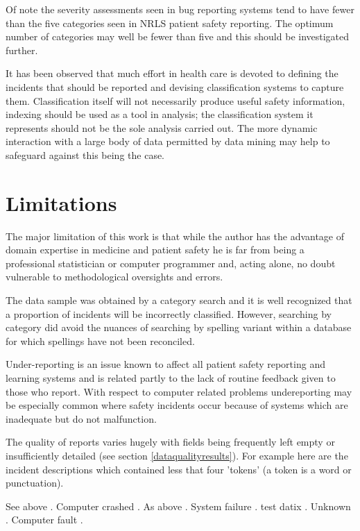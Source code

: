 Of note the severity assessments seen in bug reporting systems tend to have fewer than the five categories seen in NRLS patient safety reporting. The optimum number of categories may well be fewer than five and this should be investigated further.

It has been observed that much effort in health care is devoted to defining the incidents that should be reported and devising classification systems to capture them. Classification itself will not necessarily produce useful safety information, indexing should be used as a tool in analysis; the classification system it represents should not be the sole analysis carried out.\cite{Billings1998}\cite{Vincent2007} The more dynamic interaction with a large body of data permitted by data mining may help to safeguard against this being the case. 


\section{Limitations}
The major limitation of this work is that while the author has the advantage of domain expertise in medicine and patient safety he is far from being a professional statistician or computer programmer and, acting alone, no doubt vulnerable to methodological oversights and errors. 

The data sample was obtained by a category search and it is well recognized that a proportion of incidents will be incorrectly classified. \cite{Pronovost2011}\cite{Cassidy2011} However, searching by category did avoid the nuances of searching by spelling variant within a database for which spellings have not been reconciled.

Under-reporting is an issue known to affect all patient safety reporting and learning systems and is related partly to the lack of routine feedback given to those who report.\cite{Shojania2008}\cite{Sari2007} With respect to computer related problems undereporting may be especially common where safety incidents occur because of systems which are inadequate but do not malfunction.\cite{Koppel2010}

The quality of reports varies hugely with fields being frequently left empty or insufficiently detailed (see section \ref{dataqualityresults}). For example here are the incident descriptions which contained less that four 'tokens' (a token is a word or punctuation).

\begin{pyverbatim}
See above .
Computer crashed .
As above .
System failure .
test datix .
Unknown .
Computer fault .
\end{pyverbatim} 

